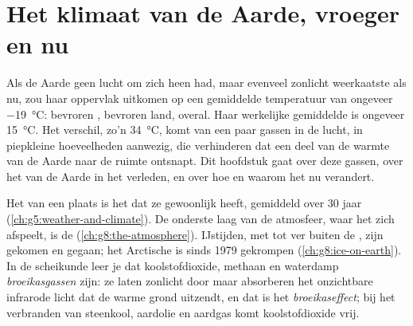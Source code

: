 \chapter{Het klimaat van de Aarde, vroeger en nu}\label{ch:g9:climate-past-and-present}

Als de Aarde geen lucht om zich heen had, maar evenveel zonlicht
weerkaatste als nu, zou haar oppervlak uitkomen op een gemiddelde
temperatuur van ongeveer \qty{-19}{\degreeCelsius}: bevroren ,
bevroren land, overal. Haar werkelijke gemiddelde is ongeveer
\qty{15}{\degreeCelsius}. Het verschil, zo'n \qty{34}{\degreeCelsius},
komt van een paar gassen in de lucht, in piepkleine hoeveelheden
aanwezig, die verhinderen dat een deel van de warmte van de Aarde naar de
ruimte ontsnapt. Dit hoofdstuk gaat over deze gassen, over het  van
de Aarde in het verleden, en over hoe en waarom het nu verandert.

\begin{recall}
Het  van een plaats is het  dat ze gewoonlijk heeft, gemiddeld
over 30 jaar (\cref{ch:g5:weather-and-climate}). De onderste laag van de
atmosfeer, waar het  zich afspeelt, is de 
(\cref{ch:g8:the-atmosphere}). IJstijden, met  tot ver buiten de
, zijn gekomen en gegaan; het Arctische  is sinds 1979
gekrompen (\cref{ch:g8:ice-on-earth}). In de scheikunde leer je dat
koolstofdioxide, methaan en waterdamp \emph{broeikasgassen} zijn: ze laten
zonlicht door maar absorberen het onzichtbare infrarode licht dat de warme
grond uitzendt, en dat is het \emph{broeikaseffect}; bij het verbranden
van steenkool, aardolie en aardgas komt koolstofdioxide vrij.
\end{recall}

